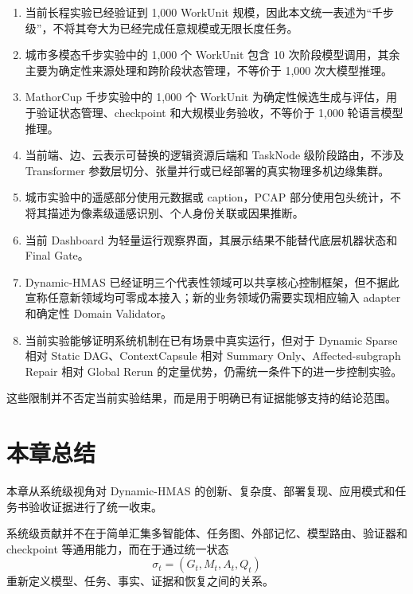 \documentclass[UTF8,a4paper,12pt,oneside]{ctexbook}
\begin{document}
\begin{enumerate}
    \item 当前长程实验已经验证到 1,000 WorkUnit 规模，因此本文统一表述为“千步级”，不将其夸大为已经完成任意规模或无限长度任务。

    \item 城市多模态千步实验中的 1,000 个 WorkUnit 包含 10 次阶段模型调用，其余主要为确定性来源处理和跨阶段状态管理，不等价于 1,000 次大模型推理。

    \item MathorCup 千步实验中的 1,000 个 WorkUnit 为确定性候选生成与评估，用于验证状态管理、checkpoint 和大规模业务验收，不等价于 1,000 轮语言模型推理。

    \item 当前端、边、云表示可替换的逻辑资源后端和 TaskNode 级阶段路由，不涉及 Transformer 参数层切分、张量并行或已经部署的真实物理多机边缘集群。

    \item 城市实验中的遥感部分使用元数据或 caption，PCAP 部分使用包头统计，不将其描述为像素级遥感识别、个人身份关联或因果推断。

    \item 当前 Dashboard 为轻量运行观察界面，其展示结果不能替代底层机器状态和 Final Gate。

    \item Dynamic-HMAS 已经证明三个代表性领域可以共享核心控制框架，但不据此宣称任意新领域均可零成本接入；新的业务领域仍需要实现相应输入 adapter 和确定性 Domain Validator。

    \item 当前实验能够证明系统机制在已有场景中真实运行，但对于 Dynamic Sparse 相对 Static DAG、ContextCapsule 相对 Summary Only、Affected-subgraph Repair 相对 Global Rerun 的定量优势，仍需统一条件下的进一步控制实验。
\end{enumerate}

这些限制并不否定当前实验结果，而是用于明确已有证据能够支持的结论范围。


\section{本章总结}

本章从系统级视角对 Dynamic-HMAS 的创新、复杂度、部署复现、应用模式和任务书验收证据进行了统一收束。

系统级贡献并不在于简单汇集多智能体、任务图、外部记忆、模型路由、验证器和 checkpoint 等通用能力，而在于通过统一状态
\[
\sigma_t=(G_t,M_t,A_t,Q_t)
\]
重新定义模型、任务、事实、证据和恢复之间的关系。
\end{document}
